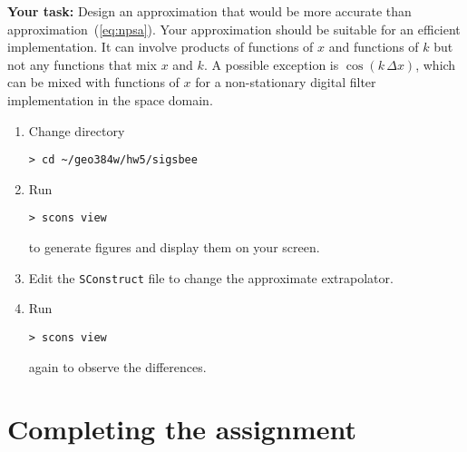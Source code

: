 \begin{enumerate}
  \textbf{Your task:} Design an approximation that would be more accurate
  than approximation~(\ref{eq:npsa}). Your approximation should be
  suitable for an efficient implementation. It can involve products of functions
  of $x$  and functions
  of $k$ but not any functions that mix $x$ and $k$. A possible exception is $\cos{(k\,\Delta x)}$, which can be mixed
  with functions of $x$ for a non-stationary digital filter implementation in the space domain.
    \begin{enumerate}
    \item Change directory 
\begin{verbatim}
> cd ~/geo384w/hw5/sigsbee
\end{verbatim}
    \item Run
\begin{verbatim}
> scons view
\end{verbatim}
      to generate figures and display them on your screen.  
    \item Edit the \texttt{SConstruct} file to change the approximate extrapolator.
    \item Run
\begin{verbatim}
> scons view
\end{verbatim}
      again to observe the differences.
    \end{enumerate}




\lstset{language=python,numbers=left,numberstyle=\tiny,showstringspaces=false}
{\small }

\end{enumerate}

\section{Completing the assignment}

